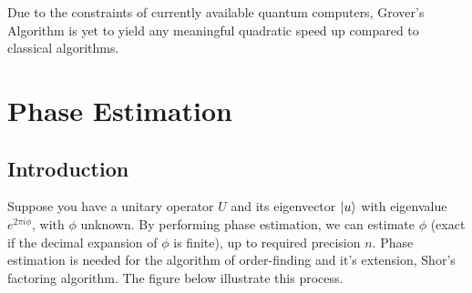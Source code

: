 \documentclass{article}
\begin{document}
\noindent
Due to the constraints of currently available quantum computers, Grover's Algorithm is yet to yield any  meaningful quadratic speed up compared to classical algorithms\cite{noauthor_grovers_2022}.   
\pagebreak

\section{Phase Estimation}
\subsection{Introduction}
Suppose you have a unitary operator $U$ and its eigenvector $\ket{u}$ with eigenvalue $e^{2\pi i \phi}$, with $\phi$ unknown. By performing phase estimation, we can estimate $\phi$ (exact if the decimal expansion of $\phi$ is finite), up to required precision $n$. Phase estimation is needed for the algorithm of order-finding and it's extension, Shor's factoring algorithm. The figure below illustrate this process.
\end{document}
